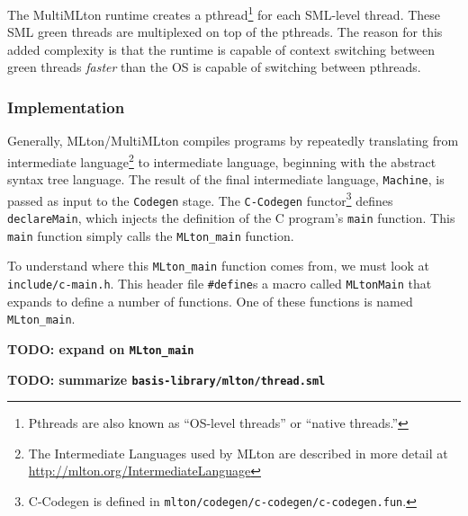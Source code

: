 \documentclass{article}
\begin{document}
The MultiMLton runtime creates a pthread\footnote{Pthreads are also
  known as ``OS-level threads'' or ``native threads.''} for each
SML-level thread. These SML green threads are multiplexed on top of
the pthreads. The reason for this added complexity is that the runtime
is capable of context switching between green threads \textit{faster}
than the OS is capable of switching between pthreads.

\subsubsection{Implementation}

Generally, MLton/MultiMLton compiles programs by repeatedly
translating from intermediate language\footnote{The Intermediate
  Languages used by MLton are described in more detail at
  \url{http://mlton.org/IntermediateLanguage}} to intermediate
language, beginning with the abstract syntax tree language.  The
result of the final intermediate language, \texttt{Machine}, is passed
as input to the \texttt{Codegen} stage.  The \texttt{C-Codegen}
functor\footnote{C-Codegen is defined in
  \texttt{mlton/codegen/c-codegen/c-codegen.fun}.} defines
\texttt{declareMain}, which injects the definition of the C program's
\texttt{main} function.  This \texttt{main} function simply calls the
\texttt{MLton\_main} function.

To understand where this \texttt{MLton\_main} function comes from, we
must look at \texttt{include/c-main.h}. This header file
\texttt{\#define}s a macro called \texttt{MLtonMain} that expands to
define a number of functions. One of these functions is named
\texttt{MLton\_main}.

\textbf{TODO: expand on \texttt{MLton\_main}}

\textbf{TODO: summarize \texttt{basis-library/mlton/thread.sml}}
\end{document}
